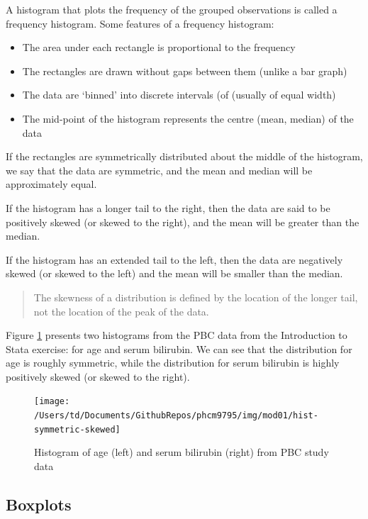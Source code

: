\documentclass[
]{memoir}
\providecommand{\tightlist}{%
  \setlength{\itemsep}{0pt}\setlength{\parskip}{0pt}}
\begin{document}
A histogram that plots the frequency of the grouped observations is called a frequency histogram. Some features of a frequency histogram:

\begin{itemize}
\tightlist
\item
  The area under each rectangle is proportional to the frequency
\item
  The rectangles are drawn without gaps between them (unlike a bar graph)
\item
  The data are `binned' into discrete intervals (of (usually of equal width)
\item
  The mid-point of the histogram represents the centre (mean, median) of the data
\end{itemize}

If the rectangles are symmetrically distributed about the middle of the histogram, we say that the data are symmetric, and the mean and median will be approximately equal.

If the histogram has a longer tail to the right, then the data are said to be positively skewed (or skewed to the right), and the mean will be greater than the median.

If the histogram has an extended tail to the left, then the data are negatively skewed (or skewed to the left) and the mean will be smaller than the median.

\begin{quote}
The skewness of a distribution is defined by the location of the longer tail, not the location of the peak of the data.
\end{quote}

Figure \ref{fig:fig-1-6} presents two histograms from the PBC data from the Introduction to Stata exercise: for age and serum bilirubin. We can see that the distribution for age is roughly symmetric, while the distribution for serum bilirubin is highly positively skewed (or skewed to the right).

\begin{figure}
\texttt{[image: /Users/td/Documents/GithubRepos/phcm9795/img/mod01/hist-symmetric-skewed]} \caption{Histogram of age (left) and serum bilirubin (right) from PBC study data}\label{fig:fig-1-6}
\end{figure}

\hypertarget{boxplots}{%
\subsection{Boxplots}\label{boxplots}}
\end{document}
